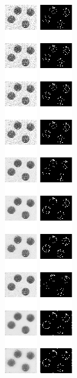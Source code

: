 \documentclass[11pt]{report}
\begin{document}
\begin{figure}[h]
\centering
\includegraphics{A3_3_1.png}
\includegraphics{A3_3_2.png}

\end{figure}
\end{document}
